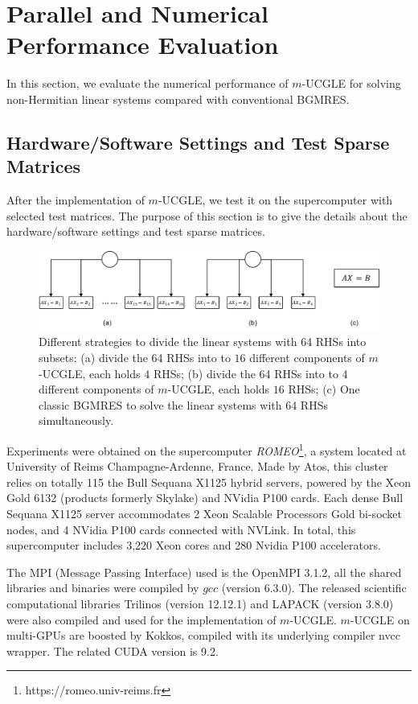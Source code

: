 \section{Parallel and Numerical Performance Evaluation}

In this section, we evaluate the numerical performance of $m$-UCGLE for solving non-Hermitian linear systems compared with conventional BGMRES.

\subsection{Hardware/Software Settings and Test Sparse Matrices}\label{hardware}

After the implementation of $m$-UCGLE, we test it on the supercomputer with selected test matrices. The purpose of this section is to give the details about the hardware/software settings and test sparse matrices.

\begin{figure}[htbp]
	\centering
	\includegraphics[width=6.4in]{fig/alloc.pdf}
	\caption{Different strategies to divide the linear systems with 64 RHSs into subsets: (a) divide the 64 RHSs into to $16$ different components of $m$-UCGLE, each holds $4$ RHSs; (b) divide the 64 RHSs into to $4$ different components of $m$-UCGLE, each holds $16$ RHSs; (c) One classic BGMRES to solve the linear systems with 64 RHSs simultaneously.}
	\label{fig:alloc}
\end{figure}

Experiments were obtained on the supercomputer \textit{ROMEO}\footnote{https://romeo.univ-reims.fr}, a system located at University of Reims Champagne-Ardenne, France. Made by Atos, this cluster relies on totally 115 the Bull Sequana X1125 hybrid servers, powered by the Xeon Gold 6132 (products formerly Skylake) and NVidia P100 cards. Each dense Bull Sequana X1125 server accommodates 2 Xeon Scalable Processors Gold bi-socket nodes, and 4 NVidia P100 cards connected with NVLink. In total, this supercomputer includes 3,220 Xeon cores and 280 Nvidia P100 accelerators.

The MPI (Message Passing Interface) used is the OpenMPI 3.1.2, all the shared libraries and binaries were compiled by $gcc$ (version 6.3.0). The released scientific computational libraries Trilinos (version 12.12.1) and LAPACK (version 3.8.0) were also compiled and used for the implementation of $m$-UCGLE. $m$-UCGLE on multi-GPUs are boosted by Kokkos, compiled with its underlying compiler nvcc wrapper. The related CUDA version is 9.2.

